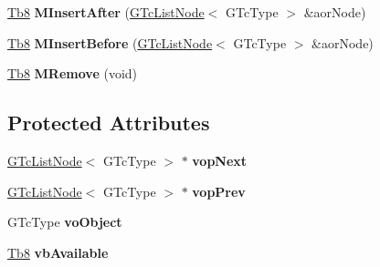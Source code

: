 \begin{DoxyCompactItemize}
\mbox{\hyperlink{namespace_g_n_common_a8115dc7ed53b6e5b52e6bfde1632ea74}{Tb8}} {\bfseries M\+Insert\+After} (\mbox{\hyperlink{class_g_n_common_1_1_n_containers_1_1_g_tc_list_node}{G\+Tc\+List\+Node}}$<$ G\+Tc\+Type $>$ \&aor\+Node)
\item 
\mbox{\label{class_g_n_common_1_1_n_containers_1_1_g_tc_list_node_a67448d9e550da3acb51a1469bb21fcf2}} 
\mbox{\hyperlink{namespace_g_n_common_a8115dc7ed53b6e5b52e6bfde1632ea74}{Tb8}} {\bfseries M\+Insert\+Before} (\mbox{\hyperlink{class_g_n_common_1_1_n_containers_1_1_g_tc_list_node}{G\+Tc\+List\+Node}}$<$ G\+Tc\+Type $>$ \&aor\+Node)
\item 
\mbox{\label{class_g_n_common_1_1_n_containers_1_1_g_tc_list_node_a688a9ed0ea087b16d18d8bedaffa2299}} 
\mbox{\hyperlink{namespace_g_n_common_a8115dc7ed53b6e5b52e6bfde1632ea74}{Tb8}} {\bfseries M\+Remove} (void)
\end{DoxyCompactItemize}
\subsection*{Protected Attributes}
\begin{DoxyCompactItemize}
\item 
\mbox{\label{class_g_n_common_1_1_n_containers_1_1_g_tc_list_node_af93509661668861bd31387c744451143}} 
\mbox{\hyperlink{class_g_n_common_1_1_n_containers_1_1_g_tc_list_node}{G\+Tc\+List\+Node}}$<$ G\+Tc\+Type $>$ $\ast$ {\bfseries vop\+Next}
\item 
\mbox{\label{class_g_n_common_1_1_n_containers_1_1_g_tc_list_node_aa5249ecdfe6ec1b7f0bd40df99fa071d}} 
\mbox{\hyperlink{class_g_n_common_1_1_n_containers_1_1_g_tc_list_node}{G\+Tc\+List\+Node}}$<$ G\+Tc\+Type $>$ $\ast$ {\bfseries vop\+Prev}
\item 
\mbox{\label{class_g_n_common_1_1_n_containers_1_1_g_tc_list_node_addaf7e3067ae969fde633b63be203bf8}} 
G\+Tc\+Type {\bfseries vo\+Object}
\item 
\mbox{\label{class_g_n_common_1_1_n_containers_1_1_g_tc_list_node_a44a4bdf6606a747e616753e68d211f76}} 
\mbox{\hyperlink{namespace_g_n_common_a8115dc7ed53b6e5b52e6bfde1632ea74}{Tb8}} {\bfseries vb\+Available}
\end{DoxyCompactItemize}


